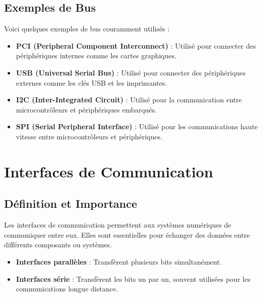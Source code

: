 \documentclass[10pt,a4paper]{article}
\begin{document}
\subsection*{Exemples de Bus}

Voici quelques exemples de bus couramment utilisés :
\begin{itemize}
    \item \textbf{PCI (Peripheral Component Interconnect)} : Utilisé pour connecter des périphériques internes comme les cartes graphiques.
    \item \textbf{USB (Universal Serial Bus)} : Utilisé pour connecter des périphériques externes comme les clés USB et les imprimantes.
    \item \textbf{I2C (Inter-Integrated Circuit)} : Utilisé pour la communication entre microcontrôleurs et périphériques embarqués.
    \item \textbf{SPI (Serial Peripheral Interface)} : Utilisé pour les communications haute vitesse entre microcontrôleurs et périphériques.
\end{itemize}


\section*{Interfaces de Communication}

\subsection*{Définition et Importance}

Les interfaces de communication permettent aux systèmes numériques de communiquer entre eux. Elles sont essentielles pour échanger des données entre différents composants ou systèmes.

\begin{itemize}
    \item \textbf{Interfaces parallèles} : Transfèrent plusieurs bits simultanément.
    \item \textbf{Interfaces série} : Transfèrent les bits un par un, souvent utilisées pour les communications longue distance.
\end{itemize}

\end{document}
